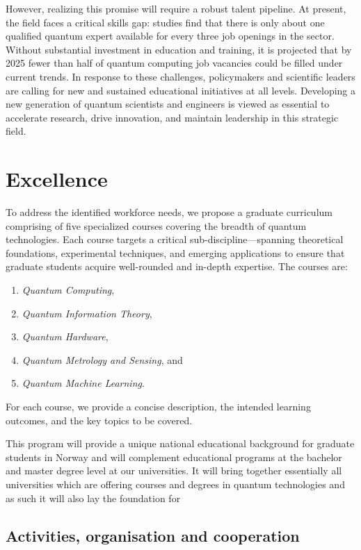 \documentclass{scrreprt}
\begin{document}
However, realizing this promise will require a robust talent
pipeline. At present, the field faces a critical skills gap: studies
find that there is only about one qualified quantum expert available
for every three job openings in the sector. Without substantial
investment in education and training, it is projected that by 2025
fewer than half of quantum computing job vacancies could be filled
under current trends. In response to these challenges, policymakers
and scientific leaders are calling for new and sustained educational
initiatives at all levels. Developing a new generation of quantum
scientists and engineers is viewed as essential to accelerate
research, drive innovation, and maintain leadership in this strategic
field.


\section{Excellence}

To address the identified workforce needs, we propose a graduate
curriculum comprising of five specialized courses covering the breadth of
quantum technologies. Each course targets a critical
sub-discipline—spanning theoretical foundations, experimental
techniques, and emerging applications to ensure that graduate students acquire
well-rounded and in-depth expertise. The courses are:
\begin{enumerate}
\item \textit{Quantum Computing},
\item \textit{Quantum Information Theory},
\item \textit{Quantum Hardware},
\item \textit{Quantum Metrology and Sensing}, and
\item \textit{Quantum Machine Learning}.
\end{enumerate}

For each course, we provide a concise description, the intended learning outcomes, and the key topics to be covered.

This program will provide a unique national educational background for
graduate students in Norway and will complement educational programs
at the bachelor and master degree level at our universities. It will bring together essentially all universities which are offering courses and degrees in quantum technologies and as such it will also lay the foundation for 

\subsection{Activities, organisation and cooperation}
\end{document}
